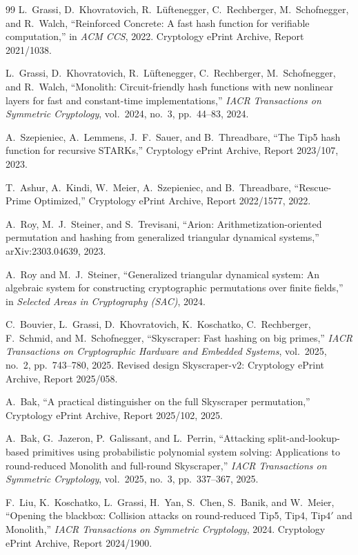 \documentclass[11pt,a4paper]{article}
\theoremstyle{definition}
\begin{document}
\begin{thebibliography}{99}
L.~Grassi, D.~Khovratovich, R.~L\"uftenegger, C.~Rechberger,
M.~Schofnegger, and R.~Walch,
``Reinforced Concrete: A fast hash function for verifiable computation,''
in \emph{ACM CCS}, 2022. Cryptology ePrint Archive, Report 2021/1038.

L.~Grassi, D.~Khovratovich, R.~L\"uftenegger, C.~Rechberger,
M.~Schofnegger, and R.~Walch,
``Monolith: Circuit-friendly hash functions with new nonlinear layers
for fast and constant-time implementations,''
\emph{IACR Transactions on Symmetric Cryptology}, vol.~2024, no.~3,
pp.~44--83, 2024.

A.~Szepieniec, A.~Lemmens, J.~F.~Sauer, and B.~Threadbare,
``The Tip5 hash function for recursive STARKs,''
Cryptology ePrint Archive, Report 2023/107, 2023.

T.~Ashur, A.~Kindi, W.~Meier, A.~Szepieniec, and B.~Threadbare,
``Rescue-Prime Optimized,''
Cryptology ePrint Archive, Report 2022/1577, 2022.

A.~Roy, M.~J.~Steiner, and S.~Trevisani,
``Arion: Arithmetization-oriented permutation and hashing from
generalized triangular dynamical systems,''
arXiv:2303.04639, 2023.

A.~Roy and M.~J.~Steiner,
``Generalized triangular dynamical system: An algebraic system for
constructing cryptographic permutations over finite fields,''
in \emph{Selected Areas in Cryptography (SAC)}, 2024.

C.~Bouvier, L.~Grassi, D.~Khovratovich, K.~Koschatko, C.~Rechberger,
F.~Schmid, and M.~Schofnegger,
``Skyscraper: Fast hashing on big primes,''
\emph{IACR Transactions on Cryptographic Hardware and Embedded
Systems}, vol.~2025, no.~2, pp.~743--780, 2025. Revised design
Skyscraper-v2: Cryptology ePrint Archive, Report 2025/058.

A.~Bak,
``A practical distinguisher on the full Skyscraper permutation,''
Cryptology ePrint Archive, Report 2025/102, 2025.

A.~Bak, G.~Jazeron, P.~Galissant, and L.~Perrin,
``Attacking split-and-lookup-based primitives using probabilistic
polynomial system solving: Applications to round-reduced Monolith and
full-round Skyscraper,''
\emph{IACR Transactions on Symmetric Cryptology}, vol.~2025, no.~3,
pp.~337--367, 2025.

F.~Liu, K.~Koschatko, L.~Grassi, H.~Yan, S.~Chen, S.~Banik, and
W.~Meier,
``Opening the blackbox: Collision attacks on round-reduced Tip5, Tip4,
Tip4$'$ and Monolith,''
\emph{IACR Transactions on Symmetric Cryptology}, 2024. Cryptology
ePrint Archive, Report 2024/1900.


\end{thebibliography}
\end{document}
